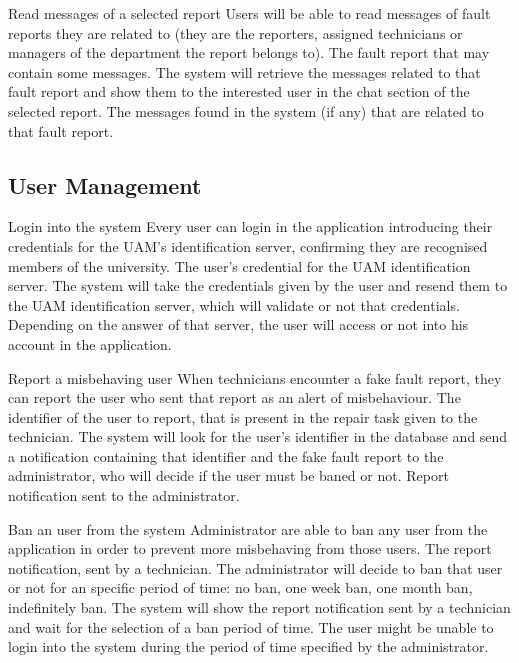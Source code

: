 \begin{requirement}{Read messages of a selected report}
\reqdesc Users will be able to read messages of fault reports they are related to (they are the reporters, assigned technicians or managers of the department the report belongs to).
\reqin The fault report that may contain some messages.
\reqsteps The system will retrieve the messages related to that fault report and show them to the interested user in the chat section of the selected report.
\reqout The messages found in the system (if any) that are related to that fault report.
\end{requirement}

\subsection{User Management}

\begin{requirement}{Login into the system}
\reqdesc Every user can login in the application introducing their credentials for the UAM's identification server, confirming they are recognised members of the university.
\reqin The user's credential for the UAM identification server.
\reqsteps The system will take the credentials given by the user and resend them to the UAM identification server, which will validate or not that credentials. 
\reqout Depending on the answer of that server, the user will access or not into his account in the application.
\end{requirement}

\begin{requirement}{Report a misbehaving user}
\reqdesc When technicians encounter a fake fault report, they can report the user who sent that report as an alert of misbehaviour.
\reqin The identifier of the user to report, that is present in the repair task given to the technician.
\reqsteps The system will look for the user's identifier in the database and send a notification containing that identifier and the fake fault report to the administrator, who will decide if the user must be baned or not. 
\reqout Report notification sent to the administrator.
\end{requirement}

\begin{requirement}{Ban an user from the system}
\reqdesc Administrator are able to ban any user from the application in order to prevent more misbehaving from those users.
\reqin The report notification, sent by a technician. The administrator will decide to ban that user or not for an specific period of time: no ban, one week ban, one month ban, indefinitely ban.
\reqsteps The system will show the report notification sent by a technician and wait for the selection of a ban period of time. 
\reqout The user might be unable to login into the system during the period of time specified by the administrator.
\end{requirement}

